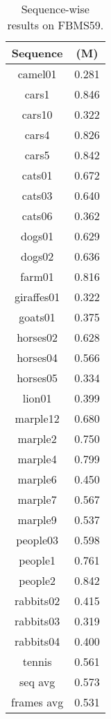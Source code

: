 \begin{table}[!htb]
\centering
\footnotesize
\begin{tabular}{c|c}

Sequence&(M)\\ \hline
camel01 & 0.281 \\ 
cars1 & 0.846 \\ 
cars10 & 0.322 \\ 
cars4 & 0.826 \\ 
cars5 & 0.842 \\ 
cats01 & 0.672 \\ 
cats03 & 0.640 \\ 
cats06 & 0.362 \\ 
dogs01 & 0.629 \\ 
dogs02 & 0.636 \\ 
farm01 & 0.816 \\ 
giraffes01 & 0.322 \\ 
goats01 & 0.375 \\ 
horses02 & 0.628 \\ 
horses04 & 0.566 \\ 
horses05 & 0.334 \\ 
lion01 & 0.399 \\ 
marple12 & 0.680 \\ 
marple2 & 0.750 \\ 
marple4 & 0.799 \\ 
marple6 & 0.450 \\ 
marple7 & 0.567 \\ 
marple9 & 0.537 \\ 
people03 & 0.598 \\ 
people1 & 0.761 \\ 
people2 & 0.842 \\ 
rabbits02 & 0.415 \\  
rabbits03 & 0.319 \\ 
rabbits04 & 0.400 \\ 
tennis & 0.561 \\ \hline
seq avg & 0.573 \\ 
frames avg & 0.531 \\ 
\end{tabular}
\caption{Sequence-wise results on FBMS59.}
\label{tab:fbms}
\end{table}

\newpage

